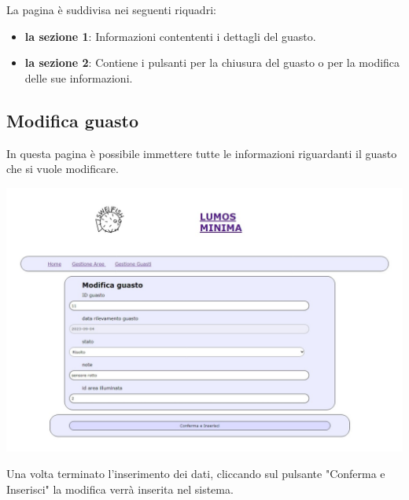 \documentclass[9pt]{article}
\begin{document}
La pagina è suddivisa nei seguenti riquadri:
\begin{itemize}
	\item \textbf{la sezione 1}: Informazioni contententi i dettagli del guasto.
	\item \textbf{la sezione 2}: Contiene i pulsanti per la chiusura del guasto o per la modifica delle sue informazioni.
\end{itemize}

\subsection{Modifica guasto}
In questa pagina è possibile immettere tutte le informazioni riguardanti il guasto che si vuole modificare.

\begin{center}
	\includegraphics[scale=0.3]{Modifica_guasto.png}
\end{center}

Una volta terminato l'inserimento dei dati, cliccando sul pulsante "Conferma e Inserisci"
la modifica verrà inserita nel sistema.
\end{document}
